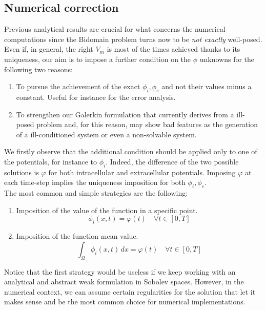 \documentclass[a4paper,11pt]{article}
\begin{document}
\subsection{Numerical correction} \label{imposition_section}
Previous analytical results are crucial for what concerns the numerical computations since the Bidomain problem turns now to be \emph{not exactly} well-posed. Even if, in general, the right $V_m$ is most of the times achieved thanks to its uniqueness, our aim is to impose a further condition on the $\phi$ unknowns for the following two reasons:
\begin{enumerate}
	\item To pursue the achievement of the exact $\phi_i,\phi_e$ and not their values minus a constant. Useful for instance for the error analysis.
	\item To strengthen our Galerkin formulation that currently derives from a ill-posed problem and, for this reason, may show bad features as the generation of a ill-conditioned system or even a non-solvable system.
\end{enumerate}

\vspace{3mm}
\noindent We firstly observe that the additional condition should be applied only to one of the potentials, for instance to $\phi_i$. Indeed, the difference of the two possible solutions is $\varphi$ for both intracellular and extracellular potentials. Imposing $\varphi$ at each time-step implies the uniqueness imposition for both $\phi_i,\phi_e$. \\

\noindent The most common and simple strategies are the following:
\begin{enumerate}
	\item Imposition of the value of the function in a specific point.
	\begin{equation*}
	\phi_i(\bar{x},t) = \varphi(t) \quad \forall t \in [0,T]
	\end{equation*}
	\item Imposition of the function mean value.
	\begin{equation*}
	\int_\Omega \phi_i(x,t)\,dx = \varphi(t) \quad \forall t \in [0,T]
	\end{equation*}
\end{enumerate}

\noindent Notice that the first strategy would be useless if we keep working with an analytical and abstract weak formulation in Sobolev spaces. However, in the numerical context, we can assume certain regularities for the solution that let it makes sense and be the most common choice for numerical implementations. \\
\end{document}
